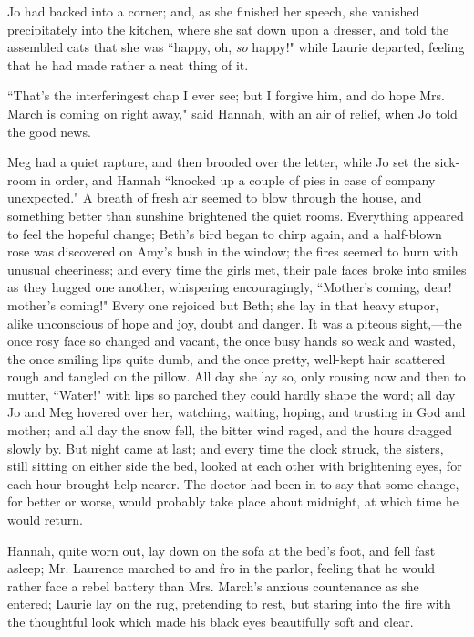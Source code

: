 Jo had backed into a corner; and, as she finished her speech, she
vanished precipitately into the kitchen, where she sat down upon a
dresser, and told the assembled cats that she was ``happy, oh, \emph{so}
happy!" while Laurie departed, feeling that he had made rather a neat
thing of it.

``That's the interferingest chap I ever see; but I
forgive him, and do hope Mrs. March is coming on right away," said
Hannah, with an air of relief, when Jo told the good news.

Meg had a quiet rapture, and then brooded over the letter, while Jo set
the sick-room in order, and Hannah ``knocked up a couple of pies in case
of company unexpected." A breath of fresh air seemed to blow through the
house, and something better than sunshine brightened the quiet rooms.
Everything appeared to feel the hopeful change; Beth's
bird began to chirp again, and a half-blown rose was discovered on
Amy's bush in the window; the fires seemed to burn with
unusual cheeriness; and every time the girls met, their pale faces broke
into smiles as they hugged one another, whispering encouragingly,
``Mother's coming, dear! mother's
coming!" Every one rejoiced but Beth; she lay in that heavy stupor,
alike unconscious of hope and joy, doubt and danger. It was a piteous
sight,---the once rosy face so changed and vacant, the once busy hands
so weak and wasted, the once smiling lips quite dumb, and the once
pretty, well-kept hair scattered rough and tangled on the pillow. All
day she lay so, only rousing now and then to mutter, ``Water!" with lips
so parched they could hardly shape the word; all day Jo and Meg hovered
over her, watching, waiting, hoping, and trusting in God and mother; and
all day the snow fell, the bitter wind raged, and the hours dragged
slowly by. But night came at last; and every time the clock struck, the
sisters, still sitting on either side the bed, looked at each other with
brightening eyes, for each hour brought help nearer. The doctor had been
in to say that some change, for better or worse, would probably take
place about midnight, at which time he would return.

Hannah, quite worn out, lay down on the sofa at the
bed's foot, and fell fast asleep; Mr. Laurence marched
to and fro in the parlor, feeling that he would rather face a rebel
battery than Mrs. March's anxious countenance as she
entered; Laurie lay on the rug, pretending to rest, but staring into the
fire with the thoughtful look which made his black eyes beautifully soft
and clear.

